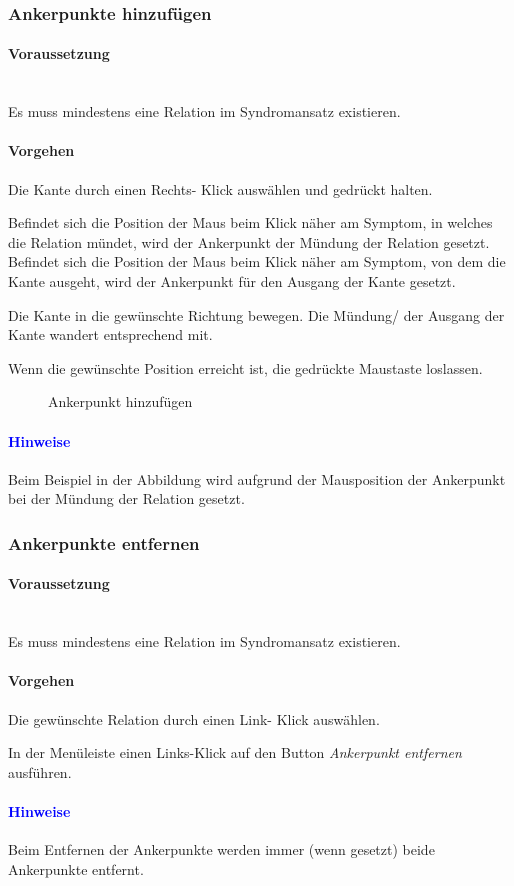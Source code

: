 \documentclass[enabledeprecatedfontcommands,fontsize=11pt,paper=a4,twoside]{scrartcl}
\newcounter{one}
\newcounter{two}[one]
\newcommand*{\hint}{\paragraph{\textcolor{blue}{Hinweise}}}
\newcommand*{\condition}{\paragraph{Voraussetzung}$\;$ \vspace{0.2cm}\\}
\newcommand*{\action}{\paragraph{Vorgehen}}
\let\tempone\itemize
\let\temptwo\enditemize
\renewenvironment{itemize}{\tempone\addtolength{\itemsep}{-10.0pt}}{\temptwo}
\let\origenumerate\enumerate
\let\origendenumerate\endenumerate
\renewenvironment{enumerate}{\origenumerate \addtolength{\itemsep}{-10.0pt}}{\origendenumerate}
\begin{document}
\subsubsection{Ankerpunkte hinzufügen}
		\condition
		Es muss mindestens eine Relation im Syndromansatz existieren.
		\action
		\begin{enumerate}
			\item Die Kante durch einen Rechts- Klick auswählen und gedrückt halten.
			\item Befindet sich die Position der Maus beim Klick näher am Symptom, in welches die Relation mündet, wird der Ankerpunkt der Mündung der Relation gesetzt. Befindet sich die Position der Maus beim Klick näher am Symptom, von dem die Kante ausgeht, wird der Ankerpunkt für den Ausgang der Kante gesetzt. 
			\item Die Kante in die gewünschte Richtung bewegen. Die Mündung/ der Ausgang der Kante wandert entsprechend mit. 
			\item Wenn die gewünschte Position erreicht ist, die gedrückte Maustaste loslassen. 
		\end{enumerate}
		\begin{figure}[ht!]
			\centering
			\caption{Ankerpunkt hinzufügen}		
		\end{figure}
		\hint
		\begin{itemize}
			\item Beim Beispiel in der Abbildung wird aufgrund der Mausposition der Ankerpunkt bei der Mündung der Relation gesetzt. \\
		\end{itemize}
		
\subsubsection{Ankerpunkte entfernen}
		\condition
		Es muss mindestens eine Relation im Syndromansatz existieren.
		\action
		\begin{enumerate}
			\item Die gewünschte Relation durch einen Link- Klick auswählen. 
			\item In der Menüleiste einen Links-Klick auf den Button \textit{Ankerpunkt entfernen} ausführen.
		\end{enumerate}
		\hint
		\begin{itemize}
			\item Beim Entfernen der Ankerpunkte werden immer (wenn gesetzt) beide Ankerpunkte entfernt.\\
		\end{itemize}
		
\end{document}
